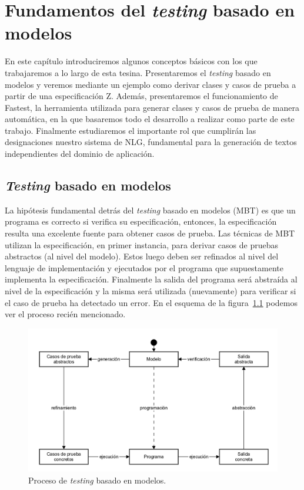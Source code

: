 \chapter[\textit{Testing} Basado en Modelos]{Fundamentos del \textit{testing} basado en modelos}
\label{cap:fundamentos}

En este capítulo introduciremos algunos conceptos básicos con los que trabajaremos a lo largo de esta tesina. Presentaremos el \textit{testing} basado en modelos y veremos mediante un ejemplo como derivar clases y casos de prueba a partir de una especificación Z. Además, presentaremos el funcionamiento de Fastest, la herramienta utilizada para generar clases y casos de prueba de manera automática, en la que basaremos todo el desarrollo a realizar como parte de este trabajo. Finalmente estudiaremos el importante rol que cumplirán las designaciones nuestro sistema de NLG, fundamental para la generación de textos independientes del dominio de aplicación.

\section{\textit{Testing} basado en modelos}

La hipótesis fundamental detrás del \textit{testing} basado en modelos (MBT) es que un programa es correcto si verifica su especificación, entonces, la especificación resulta una excelente fuente para obtener casos de prueba. Las técnicas de MBT utilizan la especificación, en primer instancia, para derivar casos de pruebas abstractos (al nivel del modelo). Estos luego deben ser refinados al nivel del lenguaje de implementación y ejecutados por el programa que supuestamente implementa la especificación. Finalmente la salida del programa será abstraída al nivel de la especificación y la misma será utilizada (nuevamente) para verificar si el caso de prueba ha detectado un error. En el esquema de la figura~\ref{fig:proc_mbt} podemos ver el proceso recién mencionado.

\begin{figure}[H]
\begin{center}
\includegraphics[scale=0.25]{img/proc_mbt.png}
\caption{Proceso de \textit{testing} basado en modelos.}
\label{fig:proc_mbt}
\end{center}
\end{figure}


